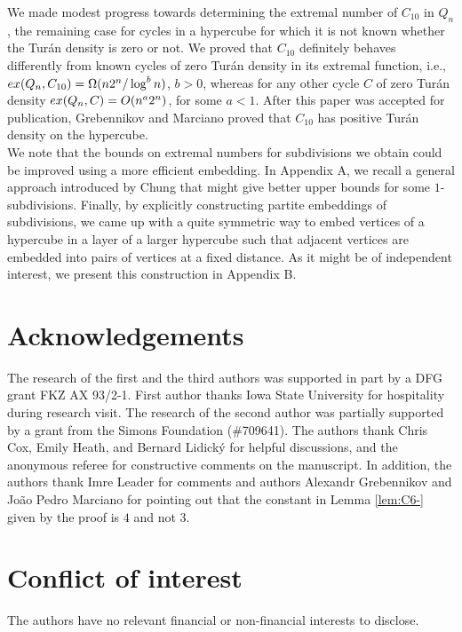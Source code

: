\documentclass[11pt, a4paper]{article}
\newcommand{\ex}{{\rm  ex}}
\begin{document}
We made  modest progress towards determining the extremal number of $C_{10}$ in $Q_n$, the remaining case for cycles in a hypercube for which it is not known whether the Tur\'an density is zero or not. 
We proved that $C_{10}$ definitely behaves  differently  from known cycles of zero Tur\'an density in its extremal function, i.e., $\ex(Q_n, C_{10}) = \Omega (n2^n/ \log^b n)$, $b>0$, whereas for any other cycle $C$ of zero Tur\'an density
$\ex(Q_n, C) = O(n^a2^n)$, for some $a<1$.  After this paper was accepted for publication,  Grebennikov and Marciano \cite{GM} proved  that $C_{10}$ has positive Tur\'an density on the hypercube.\\


We note that the bounds on extremal numbers for subdivisions we obtain could be improved using a more efficient embedding. In Appendix A, we recall a general approach introduced by  Chung that might give better upper bounds for some $1$-subdivisions.
Finally, by explicitly constructing partite embeddings of subdivisions, we came up with a quite symmetric way to embed vertices of a hypercube in a layer of a larger hypercube such that adjacent vertices are embedded into pairs of vertices at a  fixed distance.  As it might be of independent interest, we present this construction in  Appendix B. \\


\section{Acknowledgements} The research of the first and the third authors was supported in part by a DFG grant FKZ AX 93/2-1. First author thanks Iowa State University for hospitality during research visit.  The research of the second author was partially supported by a grant from the Simons Foundation (\#709641). The authors thank Chris Cox, Emily Heath, and Bernard Lidick\'y for helpful  discussions, and the anonymous referee for constructive comments on the manuscript. In addition, the authors thank Imre Leader for comments and authors Alexandr Grebennikov and Jo\~ao Pedro  Marciano for pointing out that the constant in Lemma \ref{lem:C6-} given by the proof is $4$ and not $3$.

 

\section{Conflict of interest} The authors have no relevant financial or non-financial interests to disclose.
\end{document}
